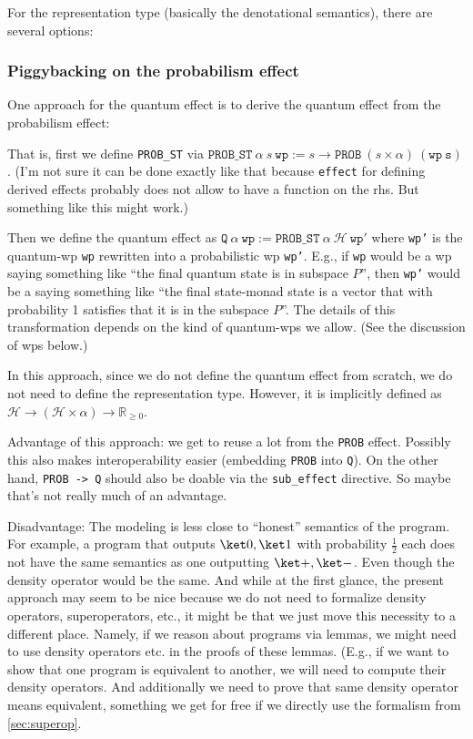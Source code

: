 \documentclass[a4paper]{article}
\newcommand\setR{\mathbb R}
\newcommand\Rpos{\setR_{\geq0}}
\newcommand\calH{\mathcal H}
\begin{document}
For the representation type (basically the denotational semantics), there are several options:

\subsubsection{Piggybacking on the probabilism effect}
\label{sec:piggy.prob}
  
One approach for the quantum effect is to derive the quantum effect
from the probabilism effect:

That is, first we define \texttt{PROB\_ST} via
$\mathtt{PROB\_ST}\ \alpha\ s\ \mathtt{wp} := s \to \mathtt{PROB}\
(s\times \alpha)\ \mathtt{(wp\ s)}$. (I'm not sure it can be done exactly like that
because \texttt{effect} for defining derived effects probably does not
allow to have a function on the rhs. But something like this might
work.)

Then we define the quantum effect as
$\mathtt{Q}\ \alpha\ \mathtt{wp} := \mathtt{PROB\_ST}\ \alpha\ \calH\
\mathtt{wp'}$ where \texttt{wp'} is the quantum-wp \texttt{wp}
rewritten into a probabilistic wp \texttt{wp'}.  E.g., if \texttt{wp}
would be a wp saying something like ``the final quantum state is in
subspace $P$'', then \texttt{wp'} would be a saying something like ``the final state-monad state is a vector that with probability 1 satisfies that it is in the subspace $P$''. The details of this transformation depends on the kind of quantum-wps we allow. (See the discussion of wps below.)

In this approach, since we do not define the quantum effect from scratch, we do not need to define the representation type.
However, it is implicitly defined as $\calH\to(\calH\times\alpha)\to\Rpos$.

Advantage of this approach: we get to reuse a lot from the \texttt{PROB} effect. Possibly this also makes interoperability easier (embedding \texttt{PROB} into \texttt{Q}). On the other hand, \texttt{PROB -> Q} should also be doable via the \texttt{sub\_effect} directive. So maybe that's not really much of an advantage. 

Disadvantage: The modeling is less close to ``honest'' semantics of the program.
For example, a program that outputs $\ket0,\ket1$ with probability $\frac12$ each does not have the same semantics as one outputting $\ket+,\ket-$.
Even though the density operator would be the same.
And while at the first glance, the present approach may seem to be nice because we do not need to formalize density operators, superoperators, etc., it might be that we just move this necessity to a different place.
Namely, if we reason about programs via lemmas, we might need to use density operators etc. in the proofs of these lemmas. (E.g., if we want to show that one program is equivalent to another, we will need to compute their density operators.
And additionally we need to prove that same density operator means equivalent, something we get for free if we directly use the formalism from \autoref{sec:superop}.
\end{document}
